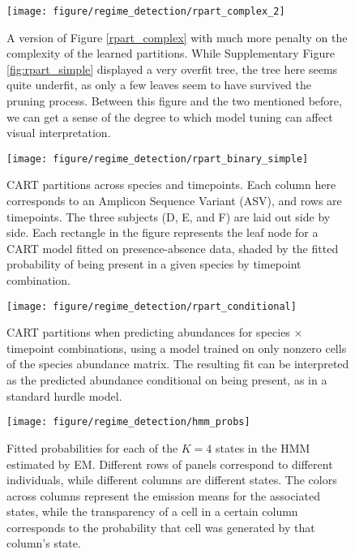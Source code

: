 \begin{figure}
  \centering
  \texttt{[image: figure/regime\_detection/rpart\_complex\_2]}
  \caption{
    A version of Figure \ref{rpart_complex} with much more penalty on the
    complexity of the learned partitions. While Supplementary Figure \ref{fig:rpart_simple}
    displayed a very overfit tree, the tree here seems quite underfit, as only a
    few leaves seem to have survived the pruning process. Between this figure
    and the two mentioned before, we can get a sense of the degree to which
    model tuning can affect visual interpretation.
    \label{fig:rpart_complex_2} }
\end{figure}

\begin{figure}
  \centering
  \texttt{[image: figure/regime\_detection/rpart\_binary\_simple]}
  \caption{CART partitions across species and timepoints. Each column here
    corresponds to an Amplicon Sequence Variant (ASV), and rows are timepoints.
    The three subjects (D, E, and F) are laid out side by side. Each rectangle
    in the figure represents the leaf node for a CART model fitted on
    presence-absence data, shaded by the fitted probability of being present in
    a given species by timepoint combination.
    \label{fig:rpart_binary_simple}}
\end{figure}

\begin{figure}
  \centering
  \texttt{[image: figure/regime\_detection/rpart\_conditional]}
  \caption{CART partitions when predicting abundances for species $\times$
    timepoint combinations, using a model trained on only nonzero cells of the
    species abundance matrix. The resulting fit can be interpreted as the
    predicted abundance conditional on being present, as in a standard hurdle
    model. \label{fig:rpart_conditional} }
\end{figure}

\begin{figure}
  \centering
  \texttt{[image: figure/regime\_detection/hmm\_probs]}
  \caption{Fitted probabilities for each of the $K = 4$ states in the HMM
    estimated by EM. Different rows of panels correspond to different
    individuals, while different columns are different states. The colors across
    columns represent the emission means for the associated states, while the
    transparency of a cell in a certain column corresponds to the probability
    that cell was generated by that column's state. \label{fig:hmm_probs} }
\end{figure}


